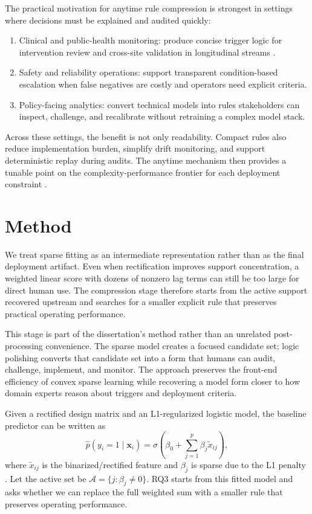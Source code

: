 The practical motivation for anytime rule compression is strongest in settings where decisions must be explained and audited quickly:
\begin{enumerate}
	\item Clinical and public-health monitoring: produce concise trigger logic for intervention review and cross-site validation in longitudinal streams \autocite{wong2010longitudinal,hiploylee2017}.
	\item Safety and reliability operations: support transparent condition-based escalation when false negatives are costly and operators need explicit criteria.
	\item Policy-facing analytics: convert technical models into rules stakeholders can inspect, challenge, and recalibrate without retraining a complex model stack.
\end{enumerate}

Across these settings, the benefit is not only readability. Compact rules also reduce implementation burden, simplify drift monitoring, and support deterministic replay during audits. The anytime mechanism then provides a tunable point on the complexity-performance frontier for each deployment constraint \autocite{JOrender2025Anytime,WJMurdoch2019Definitions}.

\section{Method}

We treat sparse fitting as an intermediate representation rather than as the final deployment artifact. Even when rectification improves support concentration, a weighted linear score with dozens of nonzero lag terms can still be too large for direct human use. The compression stage therefore starts from the active support recovered upstream and searches for a smaller explicit rule that preserves practical operating performance.

This stage is part of the dissertation's method rather than an unrelated post-processing convenience. The sparse model creates a focused candidate set; logic polishing converts that candidate set into a form that humans can audit, challenge, implement, and monitor. The approach preserves the front-end efficiency of convex sparse learning while recovering a model form closer to how domain experts reason about triggers and deployment criteria.

Given a rectified design matrix and an L1-regularized logistic model, the baseline predictor can be written as
\begin{equation}
\label{eq:rq3-rectified-logistic-baseline}
\hat{p}(y_i=1 \mid \mathbf{x}_i)=\sigma\!\left(\beta_0+\sum_{j=1}^{p}\beta_j \tilde{x}_{ij}\right),
\end{equation}
where $\tilde{x}_{ij}$ is the binarized/rectified feature and $\beta_j$ is sparse due to the L1 penalty \autocite{tibshirani1996,fried2010,tay2023}. Let the active set be $\mathcal{A}=\{j:\beta_j\neq 0\}$. RQ3 starts from this fitted model and asks whether we can replace the full weighted sum with a smaller rule that preserves operating performance.

